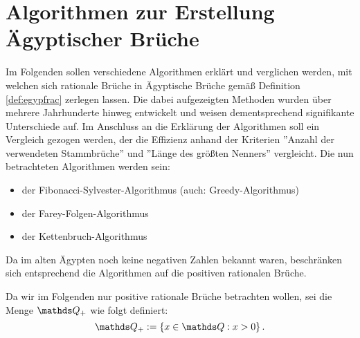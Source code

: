 \section{Algorithmen zur Erstellung Ägyptischer Brüche}\label{sec:algorithmen}
Im Folgenden sollen verschiedene Algorithmen erklärt und verglichen werden, mit welchen sich rationale Brüche in Ägyptische Brüche gemäß Definition \ref{def:egypfrac} zerlegen lassen. Die dabei aufgezeigten Methoden wurden über mehrere Jahrhunderte hinweg entwickelt und weisen dementsprechend signifikante Unterschiede auf. Im Anschluss an die Erklärung der Algorithmen soll ein Vergleich gezogen werden, der die Effizienz anhand der Kriterien ''Anzahl der verwendeten Stammbrüche'' und ''Länge des größten Nenners'' vergleicht.
Die nun betrachteten Algorithmen werden sein:
\begin{itemize}
	\item der Fibonacci-Sylvester-Algorithmus (auch: Greedy-Algorithmus)
	\item der Farey-Folgen-Algorithmus
	\item der Kettenbruch-Algorithmus
\end{itemize}

Da im alten Ägypten noch keine negativen Zahlen bekannt waren, beschränken sich entsprechend die Algorithmen auf die positiven rationalen Brüche.
\begin{def1}
	Da wir im Folgenden nur positive rationale Brüche betrachten wollen, sei die Menge $\Q_+$ wie folgt definiert:
	$$\Q_+ := \left\{x \in \Q: x>0\right\}.$$
\end{def1}